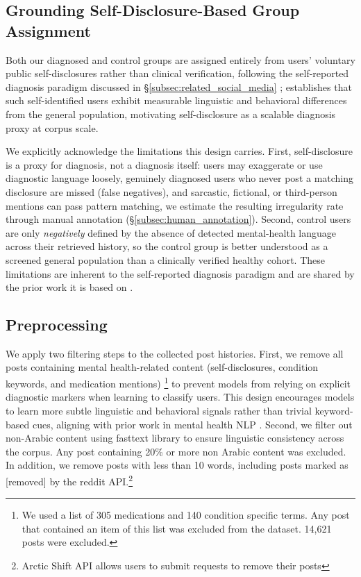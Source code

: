 \documentclass[11pt]{article}
\begin{document}
\subsection{Grounding Self-Disclosure-Based Group Assignment}
\label{subsec:self_disclosure_grounding}

Both our diagnosed and control groups are assigned entirely from users'
voluntary public self-disclosures rather than clinical verification,
following the self-reported diagnosis paradigm discussed in
\S\ref{subsec:related_social_media} \citep{coppersmith2014quantifying,
coppersmith2015clpsych, cohan-etal-2018-smhd}; \citet{de2013predicting}
establishes that such self-identified users exhibit measurable
linguistic and behavioral differences from the general population,
motivating self-disclosure as a scalable diagnosis proxy at corpus
scale.

We explicitly acknowledge the limitations this design carries. First,
self-disclosure is a proxy for diagnosis, not a diagnosis itself: users
may exaggerate or use diagnostic language loosely, genuinely diagnosed
users who never post a matching disclosure are missed (false
negatives), and sarcastic, fictional, or third-person mentions can pass
pattern matching, we estimate the resulting irregularity rate through
manual annotation (\S\ref{subsec:human_annotation}). Second, control
users are only \textit{negatively} defined by the absence of detected
mental-health language across their retrieved history, so the control
group is better understood as a screened general population than a
clinically verified healthy cohort. These limitations are inherent to
the self-reported diagnosis paradigm and are shared by the prior work
it is based on \citep{coppersmith2014quantifying, cohan-etal-2018-smhd}.

\subsection{Preprocessing}

We apply two filtering steps to the collected post histories. First, we remove all posts containing mental health-related content (self-disclosures, condition keywords, and medication mentions) \footnote{We used a list of 305 medications and 140 condition specific terms. Any post that contained an item of this list was excluded from the dataset. 14,621 posts were excluded.} to prevent models from relying on explicit diagnostic markers when learning to classify users. This design encourages models to learn more subtle linguistic and behavioral signals rather than trivial keyword-based cues, aligning with prior work in mental health NLP \cite{cohan-etal-2018-smhd}. Second, we filter out non-Arabic content using fasttext library to ensure linguistic consistency across the corpus. Any post containing 20\% or more non Arabic content was excluded. In addition, we remove posts with less than 10 words, including posts marked as [removed] by the reddit API.\footnote{Arctic Shift API allows users to submit requests to remove their posts}
\end{document}
